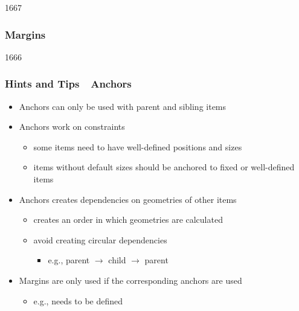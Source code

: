 
\begin{slide}{1667}\frametitle{Margins}


\end{slide}


\begin{slide}{1666}\frametitle{Hints and Tips~\textendash~Anchors}

\begin{itemize}
\item Anchors can only be used with parent and sibling items
\item Anchors work on constraints
  \begin{itemize}
  \item some items need to have well-defined positions and sizes
  \item items without default sizes should be anchored to fixed or well-defined items
  \end{itemize}
\item Anchors creates dependencies on geometries of other items
  \begin{itemize}
  \item creates an order in which geometries are calculated
  \item avoid creating circular dependencies
    \begin{itemize}
    \item e.g., parent $\rightarrow$ child $\rightarrow$ parent
    \end{itemize}
  \end{itemize}
\item Margins are only used if the corresponding anchors are used
  \begin{itemize}
  \item e.g.,  needs  to be defined
  \end{itemize}
\end{itemize}

\end{slide}


